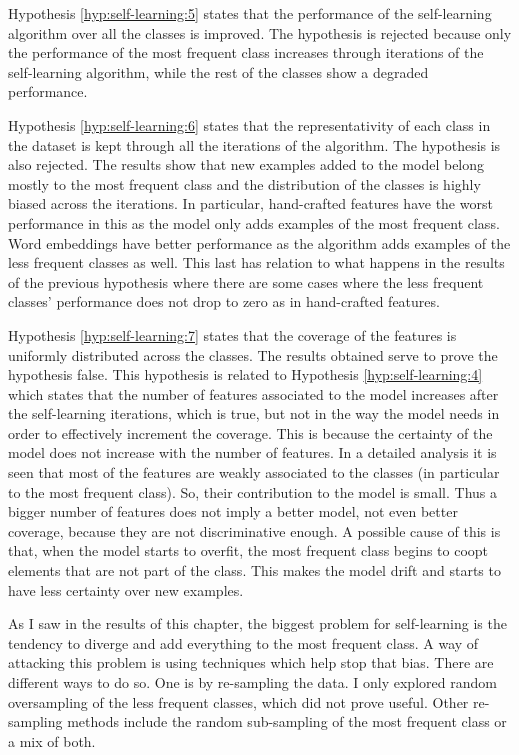 Hypothesis \ref{hyp:self-learning:5} states that the performance of the
self-learning algorithm over all the classes is improved. The hypothesis is
rejected because only the performance of the most frequent class increases
through iterations of the self-learning algorithm, while the rest of the
classes show a degraded performance.

Hypothesis \ref{hyp:self-learning:6} states that the representativity of each
class in the dataset is kept through all the iterations of the algorithm. The
hypothesis is also rejected. The results show that new examples added to the
model belong mostly to the most frequent class and the distribution of the
classes is highly biased across the iterations. In particular, hand-crafted
features have the worst performance in this as the model only adds examples of
the most frequent class. Word embeddings have better performance as the
algorithm adds examples of the less frequent classes as well. This last has
relation to what happens in the results of the previous hypothesis where there
are some cases where the less frequent classes' performance does not drop to
zero as in hand-crafted features.

Hypothesis \ref{hyp:self-learning:7} states that the coverage of the features
is uniformly distributed across the classes. The results obtained serve to
prove the hypothesis false. This hypothesis is related to Hypothesis
\ref{hyp:self-learning:4} which states that the number of features associated
to the model increases after the self-learning iterations, which is true, but
not in the way the model needs in order to effectively increment the coverage.
This is because the certainty of the model does not increase with the number of
features. In a detailed analysis it is seen that most of the features are
weakly associated to the classes (in particular to the most frequent class).
So, their contribution to the model is small. Thus a bigger number of features
does not imply a better model, not even better coverage, because they are not
discriminative enough. A possible cause of this is that, when the model starts
to overfit, the most frequent class begins to coopt elements that are not part
of the class. This makes the model drift and starts to have less certainty over
new examples.

As I saw in the results of this chapter, the biggest problem for self-learning
is the tendency to diverge and add everything to the most frequent class. A
way of attacking this problem is using techniques which help stop that bias.
There are different ways to do so. One is by re-sampling the data. I only
explored random oversampling of the less frequent classes, which did not prove
useful. Other re-sampling methods include the random sub-sampling of the most
frequent class or a mix of both.

